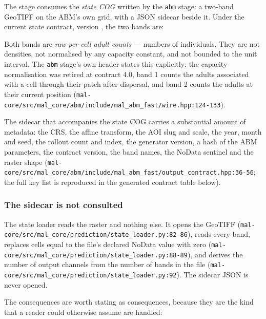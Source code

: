 \documentclass[11pt,a4paper]{article}
\newcommand{\code}[1]{\texttt{#1}}
\begin{document}
The stage consumes the \emph{state COG} written by the \code{abm} stage: a
two-band GeoTIFF on the ABM's own grid, with a JSON sidecar beside it. Under
the current state contract, version , the two
bands are:



Both bands are \emph{raw per-cell adult counts} --- numbers of individuals.
They are not densities, not normalised by any capacity constant, and not
bounded to the unit interval. The \code{abm} stage's own header states this
explicitly: the capacity normalisation was retired at contract 4.0, band 1
counts the adults associated with a cell through their patch after dispersal,
and band 2 counts the adults at their current position
(\code{mal-core/src/mal\_core/abm/include/mal\_abm\_fast/wire.hpp:124-133}).

The sidecar that accompanies the state COG carries a substantial amount of
metadata: the CRS, the affine transform, the AOI slug and scale, the year,
month and seed, the rollout count and index, the generator version, a hash of
the ABM parameters, the contract version, the band names, the NoData
sentinel and the raster shape
(\code{mal-core/src/mal\_core/abm/include/mal\_abm\_fast/output\_contract.hpp:36-56};
the full key list is reproduced in the generated contract table below).



\subsubsection{The sidecar is not consulted}

The state loader reads the raster and nothing else. It opens the GeoTIFF
(\code{mal-core/src/mal\_core/prediction/state\_loader.py:82-86}), reads every
band, replaces cells equal to the file's declared NoData value with zero
(\code{mal-core/src/mal\_core/prediction/state\_loader.py:88-89}), and derives
the number of output channels from the number of bands in the file
(\code{mal-core/src/mal\_core/prediction/state\_loader.py:92}). The sidecar
JSON is never opened.

The consequences are worth stating as consequences, because they are the
kind that a reader could otherwise assume are handled:
\end{document}
